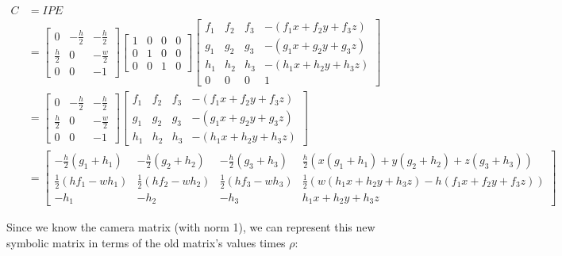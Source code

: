 \documentclass{article}
\begin{document}
\begin{align}
C &= I P E \\
  &= \begin{bmatrix}
0           & -\frac{h}{2} &  -\frac{h}{2} \\
\frac{h}{2} &            0 &  -\frac{w}{2} \\
0           &            0 &            -1
\end{bmatrix} \begin{bmatrix}
1 & 0 & 0 & 0 \\
0 & 1 & 0 & 0 \\
0 & 0 & 1 & 0
\end{bmatrix} \begin{bmatrix}
f_1 & f_2 & f_3 & -(f_1 x + f_2 y + f_3 z) \\
g_1 & g_2 & g_3 & -(g_1 x + g_2 y + g_3 z) \\
h_1 & h_2 & h_3 & -(h_1 x + h_2 y + h_3 z) \\
  0 &   0 &   0 &                        1
\end{bmatrix} \\
  &= \begin{bmatrix}
0           & -\frac{h}{2} &  -\frac{h}{2} \\
\frac{h}{2} &            0 &  -\frac{w}{2} \\
0           &            0 &            -1
\end{bmatrix} \begin{bmatrix}
f_1 & f_2 & f_3 & -(f_1 x + f_2 y + f_3 z) \\
g_1 & g_2 & g_3 & -(g_1 x + g_2 y + g_3 z) \\
h_1 & h_2 & h_3 & -(h_1 x + h_2 y + h_3 z)
\end{bmatrix} \\
  &= \begin{bmatrix}
-\frac{h}{2}(g_1 + h_1) & -\frac{h}{2}(g_2 + h_2) & -\frac{h}{2}(g_3 + h_3) & \frac{h}{2}(x(g_1 + h_1) + y(g_2 + h_2) + z(g_3 + h_3)) \\
\frac{1}{2}(h f_1 - w h_1) & \frac{1}{2}(h f_2 - w h_2) & \frac{1}{2}(h f_3 - w h_3) & \frac{1}{2}(w(h_1 x + h_2 y + h_3 z) - h(f_1 x + f_2 y + f_3 z)) \\
                   -h_1 &                    -h_2 &                    -h_3 & h_1 x + h_2 y + h_3 z
\end{bmatrix}
\end{align}

Since we know the camera matrix (with norm 1), we can represent this new symbolic 
matrix in terms of the old matrix's values times $\rho$:
\end{document}
